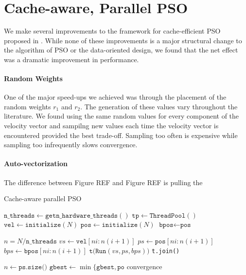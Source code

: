 \section{Cache-aware, Parallel PSO}\label{sec:algo}
We make several improvements to the framework for cache-efficient PSO proposed
in \cite{cache-pso}. While none of these improvements is a major structural
change to the algorithm of PSO or the data-oriented design, we found that the
net effect was a dramatic improvement in performance.

\paragraph{Random Weights} One of the major speed-ups we achieved was through
the placement of the random weights $r_1$ and $r_2$. The generation of these
values vary throughout the literature. We found using the same random values for
every component of the velocity vector and sampilng new values each time the
velocity vector is encountered provided the best trade-off. Sampling too often
is expensive while sampling too infrequently slows convergence.

\paragraph{Auto-vectorization}
The difference between Figure REF and Figure REF is pulling the

\begin{algorithm}
  \caption{Cache-aware parallel PSO}\label{alg:par-pso}
  \begin{algorithmic}[1]
    \State $\texttt{n\_threads} \gets \texttt{getn\_hardware\_threads}()$
    \State $\texttt{tp} \gets \texttt{ThreadPool}()$
    \State $\texttt{vel} \gets \texttt{initialize}(N)$
    \State $\texttt{pos} \gets \texttt{initialize}(N)$
    \State $\texttt{bpos} \gets \texttt{pos}$

    \State $n = N/\texttt{n\_threads}$ 
    \State $vs \gets \texttt{vel}[ni:n(i+1)]$
    \State $ps \gets \texttt{pos}[ni:n(i+1)]$
    \State $bps \gets \texttt{bpos}[ni:n(i+1)]$
    \State $\texttt{t(Run}(vs, ps, bps))$
    \EndFor
    \State \texttt{t.join()}
    \EndFor
    \EndProcedure
  \end{algorithmic}
  \begin{algorithmic}[1]
    \State $n \gets \texttt{ps.size()}$
    \Repeat
    \State $\texttt{gbest} \gets \min\{\texttt{gbest}, \texttt{po}$
    \EndFor
    \State 
    \EndFor
    \Until convergence
    \EndProcedure
  \end{algorithmic}
\end{algorithm}

